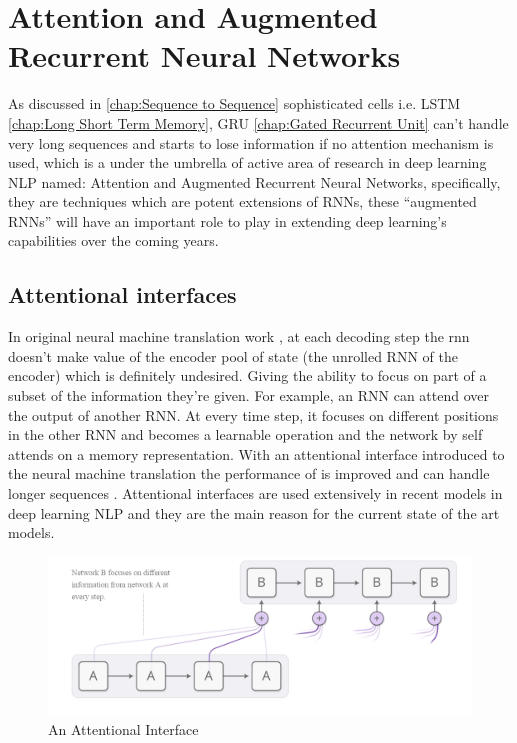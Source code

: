 \section{Attention and Augmented Recurrent Neural Networks}
\label{section:augmented}
As discussed in \ref{chap:Sequence to Sequence} 
sophisticated cells i.e. LSTM \ref{chap:Long Short Term Memory}, GRU \ref{chap:Gated Recurrent Unit}
can't handle very long sequences and starts to lose information
if no attention mechanism is used, which is a under the umbrella of active area of research in deep learning NLP named: Attention and Augmented Recurrent Neural Networks, specifically, they are techniques which are potent extensions of RNNs, these “augmented RNNs” will have an important role to play in extending deep learning’s capabilities over the coming years.

\subsection{Attentional interfaces}
In original neural machine translation work \cite{DBLP:journals/corr/SutskeverVL14}, at each decoding step the rnn doesn't make value of the encoder pool of state (the unrolled RNN of the encoder) which is definitely undesired.
Giving the ability to focus on part of a subset of the information they’re given. For example, an RNN can attend over the output of another RNN. At every time step, it focuses on different positions in the other RNN and becomes a learnable operation and the network by self attends on a memory representation. 
With an attentional interface introduced to the neural machine translation the performance of is improved and can handle longer sequences\cite{DBLP:journals/corr/BahdanauCB14} \cite{DBLP:journals/corr/LuongPM15}.
Attentional interfaces are used extensively in recent models in deep learning NLP and they are the main reason for the current state of the art models.

\begin{figure}[H]%
      \center%
        \includegraphics[width=1\textwidth]{images/komy/attentional_interface.png}%
        \caption[Attentional Interface]{An Attentional Interface}%
  \end{figure}
  

